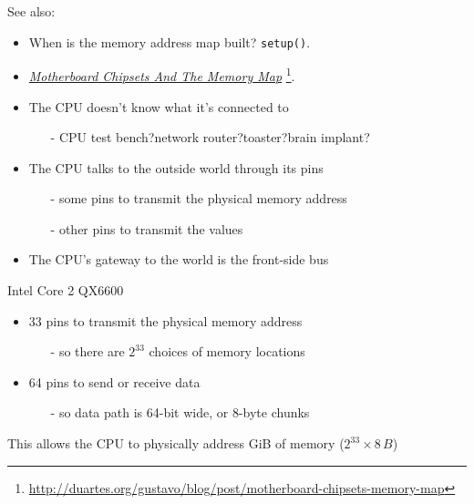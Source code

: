 See also:
\begin{itemize}
\item When is the memory address map built? \texttt{setup()}.
\item
  \href{http://duartes.org/gustavo/blog/post/motherboard-chipsets-memory-map}{\emph{Motherboard
      Chipsets And The Memory Map}}
  \footnote{\url{http://duartes.org/gustavo/blog/post/motherboard-chipsets-memory-map}}.
\end{itemize}


\begin{frame}
  \begin{itemize}
  \item The CPU doesn't know what it's connected to
    \begin{itemize}
    \item[-] CPU test bench?\quad{}network router?\quad{}toaster?\quad{}brain implant?
    \end{itemize}
  \item The CPU talks to the outside world through its pins
    \begin{itemize}
    \item[-] some pins to transmit the physical memory address
    \item[-] other pins to transmit the values
    \end{itemize}
  \item The CPU's gateway to the world is the \alert{front-side bus}
  \end{itemize}
  \begin{block}{Intel Core 2 QX6600}
    \begin{itemize}
    \item 33 pins to transmit the physical memory address
      \begin{itemize}
      \item[-] so there are \(2^{33}\) choices of memory locations
      \end{itemize}
    \item 64 pins to send or receive data
      \begin{itemize}
      \item[-] so data path is 64-bit wide, or 8-byte chunks
      \end{itemize}
    \end{itemize}
    This allows the CPU to physically address \unit[64]{GiB} of memory (\(2^{33}\times{}8\,B\))
  \end{block}
\end{frame}

